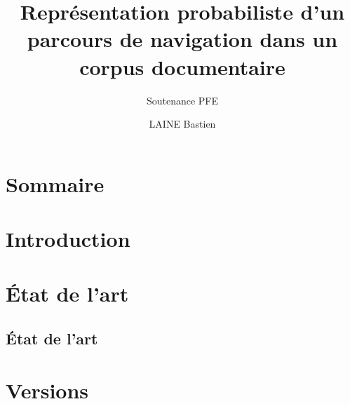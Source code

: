 \documentclass{beamer}
\title{Représentation probabiliste d’un parcours de navigation dans un corpus documentaire}
\subtitle{Soutenance PFE}
\author{LAINE Bastien}
\institute{Génie Mathématique | INSA Rouen}
\begin{document}
    \begin{frame}
        \titlepage{}
    \end{frame}

    \section*{Sommaire}

    \begin{frame}
        \tableofcontents[hideallsubsections]
    \end{frame}

    \section{Introduction}
        \begin{frame}
        \end{frame}

    \section{État de l'art}
        \subsection{État de l'art}
            \begin{frame}
            \end{frame}

    \section{Versions}
\end{document}
